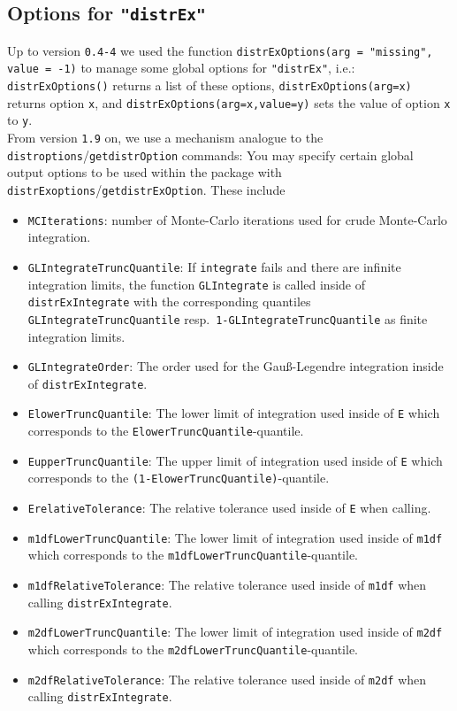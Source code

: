 \documentclass[11pt]{article}
\newcommand{\code}[1]{{\tt #1}}
\newcommand{\pkg}[1]{{\tt "#1"}}
\begin{document}
\subsection[Options for distrEx]{Options for \pkg{distrEx}}\label{distrExoptions}
Up to version {\tt 0.4-4} we used the function
 \code{distrExOptions(arg = "missing", value = -1)} to manage some global 
 options for \pkg{distrEx}, i.e.:\\
\code{distrExOptions()} returns a list of these options,
\code{distrExOptions(arg=x)} returns option \code{x}, and
\code{distrExOptions(arg=x,value=y)} sets the value of option \code{x} to
 {\tt y}.\\
 From version {\tt 1.9} on, we use a mechanism analogue to the
  \code{distroptions}/\code{getdistrOption} commands: 
You may specify certain
global output options to be used within the package with
 \code{distrExoptions}/\code{getdistrExOption}. These include
\begin{itemize}
  \item \code{MCIterations}: number of Monte-Carlo iterations used for crude
          Monte-Carlo integration.
  \item \code{GLIntegrateTruncQuantile}: If \code{integrate} fails and there are
          infinite integration limits, the function \code{GLIntegrate} is
          called inside of \code{distrExIntegrate} with the corresponding
          quantiles  \code{GLIntegrateTruncQuantile} resp.\
          \code{1-GLIntegrateTruncQuantile} as finite integration limits.
  \item \code{GLIntegrateOrder}: The order used for the Gau{\ss{}}-Legendre
          integration inside of \code{distrExIntegrate}.
  \item \code{ElowerTruncQuantile}: The lower limit of integration used inside
       of \code{E} which corresponds to the \code{ElowerTruncQuantile}-quantile.
  \item \code{EupperTruncQuantile}: The upper limit of integration used inside 
          of \code{E} which corresponds to the
          \code{(1-ElowerTruncQuantile)}-quantile.
  \item \code{ErelativeTolerance}: The relative tolerance used inside of 
        \code{E} when calling\linebreak[4] \code{distrExIntegrate}.
  \item \code{m1dfLowerTruncQuantile}: The lower limit of integration used 
        inside of \code{m1df} which corresponds to the
          \code{m1dfLowerTruncQuantile}-quantile.
  \item \code{m1dfRelativeTolerance}: The relative tolerance used inside of
          \code{m1df} when calling \code{distrExIntegrate}.
  \item \code{m2dfLowerTruncQuantile}: The lower limit of integration used 
        inside of \code{m2df} which corresponds to the
          \code{m2dfLowerTruncQuantile}-quantile.
  \item \code{m2dfRelativeTolerance}: The relative tolerance used inside of
          \code{m2df} when calling \code{distrExIntegrate}.
\end{itemize}
\end{document}
